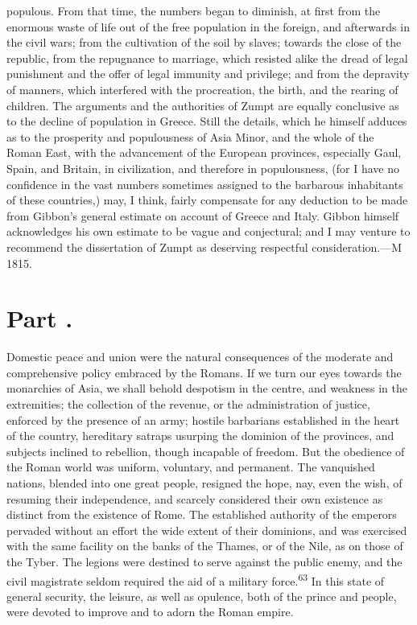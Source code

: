 {populous. From that time, the numbers began to diminish, at first
from the enormous waste of life out of the free population in the
foreign, and afterwards in the civil wars; from the cultivation
of the soil by slaves; towards the close of the republic, from
the repugnance to marriage, which resisted alike the dread of
legal punishment and the offer of legal immunity and privilege;
and from the depravity of manners, which interfered with the
procreation, the birth, and the rearing of children. The
arguments and the authorities of Zumpt are equally conclusive as
to the decline of population in Greece. Still the details, which
he himself adduces as to the prosperity and populousness of Asia
Minor, and the whole of the Roman East, with the advancement of
the European provinces, especially Gaul, Spain, and Britain, in
civilization, and therefore in populousness, (for I have no
confidence in the vast numbers sometimes assigned to the
barbarous inhabitants of these countries,) may, I think, fairly
compensate for any deduction to be made from Gibbon’s general
estimate on account of Greece and Italy. Gibbon himself
acknowledges his own estimate to be vague and conjectural; and I
may venture to recommend the dissertation of Zumpt as deserving
respectful consideration.—M 1815.}

\section{Part \thesection.}

Domestic peace and union were the natural consequences of the
moderate and comprehensive policy embraced by the Romans. If we
turn our eyes towards the monarchies of Asia, we shall behold
despotism in the centre, and weakness in the extremities; the
collection of the revenue, or the administration of justice,
enforced by the presence of an army; hostile barbarians
established in the heart of the country, hereditary satraps
usurping the dominion of the provinces, and subjects inclined to
rebellion, though incapable of freedom. But the obedience of the
Roman world was uniform, voluntary, and permanent. The vanquished
nations, blended into one great people, resigned the hope, nay,
even the wish, of resuming their independence, and scarcely
considered their own existence as distinct from the existence of
Rome. The established authority of the emperors pervaded without
an effort the wide extent of their dominions, and was exercised
with the same facility on the banks of the Thames, or of the
Nile, as on those of the Tyber. The legions were destined to
serve against the public enemy, and the civil magistrate seldom
required the aid of a military force.\textsuperscript{63} In this state of general
security, the leisure, as well as opulence, both of the prince
and people, were devoted to improve and to adorn the Roman
empire.

